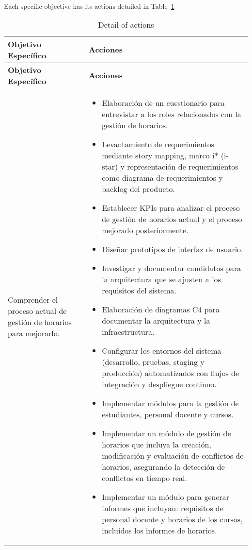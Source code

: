 Each specific objective has its actions detailed in Table~\ref{tab:actionsObjectives}
{\small
\begin{longtable}{>{\raggedright}p{2in}>{\raggedright\arraybackslash}p{4in}}
\caption{Detail of actions}
\label{tab:actionsObjectives} \\
\toprule
\textbf{Objetivo Específico} & \textbf{Acciones} \\
\midrule
\endfirsthead
\textbf{Objetivo Específico} & \textbf{Acciones} \\
\midrule
\endhead
\bottomrule
\endfoot
\hline
\endlastfoot

Comprender el proceso actual de gestión de horarios para mejorarlo. &
\begin{itemize}[nosep,leftmargin=1em,topsep=0pt]
\item Elaboración de un cuestionario para entrevistar a los roles relacionados con la gestión de horarios.
\item Levantamiento de requerimientos mediante story mapping, marco i* (i-star) y representación de requerimientos como diagrama de requerimientos y backlog del producto.
\item Establecer KPIs para analizar el proceso de gestión de horarios actual y el proceso mejorado posteriormente.
\item Diseñar prototipos de interfaz de usuario.
\item Investigar y documentar candidatos para la arquitectura que se ajusten a los requisitos del sistema.
\item Elaboración de diagramas C4 para documentar la arquitectura y la infraestructura.
\item Configurar los entornos del sistema (desarrollo, pruebas, staging y producción) automatizados con flujos de integración y despliegue continuo.
\item Implementar módulos para la gestión de estudiantes, personal docente y cursos.
\item Implementar un módulo de gestión de horarios que incluya la creación, modificación y evaluación de conflictos de horarios, asegurando la detección de conflictos en tiempo real.
\item Implementar un módulo para generar informes que incluyan: requisitos de personal docente y horarios de los cursos, incluidos los informes de horarios.
\end{itemize} \\


\end{longtable}}
